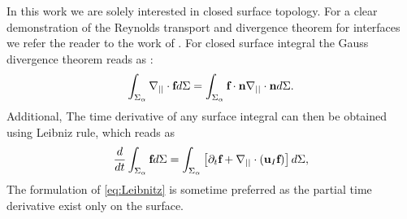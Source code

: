 In this work we are solely interested in closed surface topology. 
For a clear demonstration of the Reynolds transport and divergence theorem for interfaces we refer the reader to the work of \citet{nadim1996concise}. 
For closed surface integral the Gauss divergence theorem reads as :
\begin{equation}
    \int_{\Sigma_\alpha}  \mathbf{\nabla}_{||}\cdot \textbf{f} d\Sigma
    = 
    \int_{\Sigma_\alpha}  \textbf{f} \cdot \textbf{n}\mathbf{\nabla}_{||}\cdot\textbf{n} d\Sigma. 
    \label{eq:surf_div_theorem}
\end{equation}
Additional, The time derivative of any surface integral can then be obtained using Leibniz rule, which reads as  
\begin{equation}
    \frac{d}{d t} \int_{\Sigma_\alpha} \textbf{f} d\Sigma 
    = \int_{\Sigma_\alpha} \left[
        \partial_t \textbf{f} 
        +   \mathbf{\nabla}_{||}\cdot (\textbf{u}_I\textbf{f})
    \right]d\Sigma,
    \label{eq:Leibnitz}
\end{equation}
The formulation of \ref{eq:Leibnitz} is sometime preferred as the partial time derivative exist only on the surface. 

